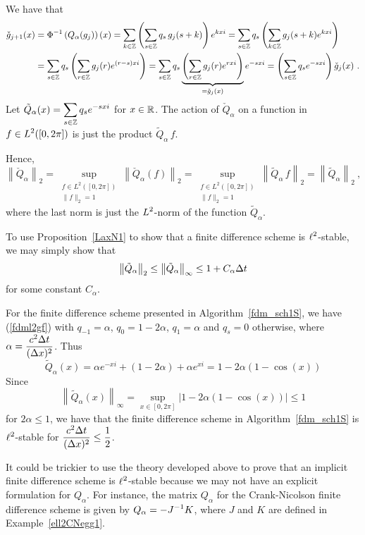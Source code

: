 We have that
\begin{align*}
\check{g}_{j+1}(x) &= \Phi^{-1}\left(Q_\alpha(g_j)\right)(x)
= \sum_{k\in \mathbb{Z}} \left(\sum_{s\in \mathbb{Z}} q_s\, g_j(s+k) \right) e^{kx i}
= \sum_{s\in \mathbb{Z}} q_s \left( \sum_{k\in \mathbb{Z}}  g_j(s+k)  e^{kx i} \right) \\
& = \sum_{s\in \mathbb{Z}} q_s \left( \sum_{r\in \mathbb{Z}}  g_j(r)  e^{(r-s)x i} \right)
= \sum_{s\in \mathbb{Z}} q_s
\underbrace{\left( \sum_{r\in \mathbb{Z}}  g_j(r)  e^{rx i}\right)}_{=\check{g}_j(x)}
  e^{-sx i}
= \left( \sum_{s\in \mathbb{Z}} q_s e^{-sx i} \right) \check{g}_j(x) \ .
\end{align*}
Let $\displaystyle \tilde{Q}_\alpha(x) = \sum_{s\in \mathbb{Z}} q_s e^{-sx i}$ for
$x \in \mathbb{R}$.  The action of $\check{Q}_\alpha$ on a function in
$\displaystyle f \in L^2([0,2\pi])$ is just the product $\tilde{Q}_\alpha\,f$.

Hence,
\[
\left\| \check{Q}_\alpha \right\|_2
= \sup_{\substack{f\in L^2([0,2\pi])\\ \|f\|_2=1}}
\left\| \check{Q}_\alpha(f) \right\|_2
= \sup_{\substack{f\in L^2([0,2\pi])\\ \|f\|_2=1}}
\left\| \tilde{Q}_\alpha \, f \right\|_2
= \left\|\tilde{Q}_\alpha \right\|_2 \ ,
\]
where the last norm is just the $\displaystyle L^2$-norm of the function
$\tilde{Q}_\alpha$.

To use Proposition~\ref{LaxN1} to show that a finite difference scheme
is $\displaystyle \ell^2$-stable, we may simply show that
\[
\left\| \tilde{Q}_\alpha \right\|_2 \leq
\left\| \tilde{Q}_\alpha \right\|_\infty \leq 1 + C_\alpha \Delta{t}
\]
for some constant $C_\alpha$.

\begin{egg}
For the finite difference scheme presented in
Algorithm~\ref{fdm_sch1S}, we have (\ref{fdml2gf}) with
$q_{-1} = \alpha$, $q_0 = 1 - 2\alpha$, $q_1 = \alpha$ and $q_s = 0$
otherwise, where
$\displaystyle \alpha = \frac{c^2\Delta{t}}{(\Delta{x})^2}$.  Thus
\[
  \tilde{Q}_\alpha(x) = \alpha e^{-xi} + (1-2\alpha) + \alpha e^{xi}
= 1 - 2\alpha(1 -\cos(x))
\]
Since
\[
  \left\|\tilde{Q}_\alpha(x)\right\|_\infty =
  \sup_{x \in [0,2\pi]}|1 - 2\alpha(1 -\cos(x))| \leq 1
\]
for $2\alpha \leq 1$, we have that the finite difference scheme in 
Algorithm~\ref{fdm_sch1S} is $\displaystyle \ell^2$-stable for
$\displaystyle \frac{c^2\Delta{t}}{(\Delta{x})^2} \leq \frac{1}{2}$.
\end{egg}

It could be trickier to use the theory developed above to prove that
an implicit finite difference scheme is $\displaystyle \ell^2$-stable
because we may
not have an explicit formulation for $Q_\alpha$.  For instance, the
matrix $Q_\alpha$ for the Crank-Nicolson finite difference scheme is
given by $\displaystyle Q_\alpha = -J^{-1} K$, where $J$ and $K$ are defined in
Example~\ref{ell2CNegg1}.

